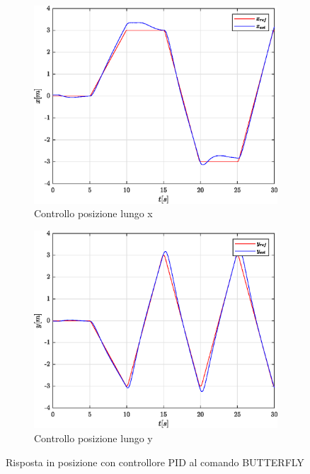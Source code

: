 \begin{figure}
	\centering
	\begin{subfigure}{0.45\textwidth}
		\centering
		\includegraphics[width=1\textwidth]{Simulazioni/Figure/PID/BUTTERFLY/PositionControlXPos}
		\caption{Controllo posizione lungo x}
		\label{fig:BUTTERFLYerrposxPID}
	\end{subfigure}
	\hfill
	\begin{subfigure}{0.45\textwidth}
		\centering
		\includegraphics[width=1\textwidth]{Simulazioni/Figure/PID/BUTTERFLY/PositionControlYPos}
		\caption{Controllo posizione lungo y}
		\label{fig:BUTTERFLYerrposyPID}
	\end{subfigure}
	\caption{Risposta in posizione con controllore PID al comando BUTTERFLY}
\end{figure}

